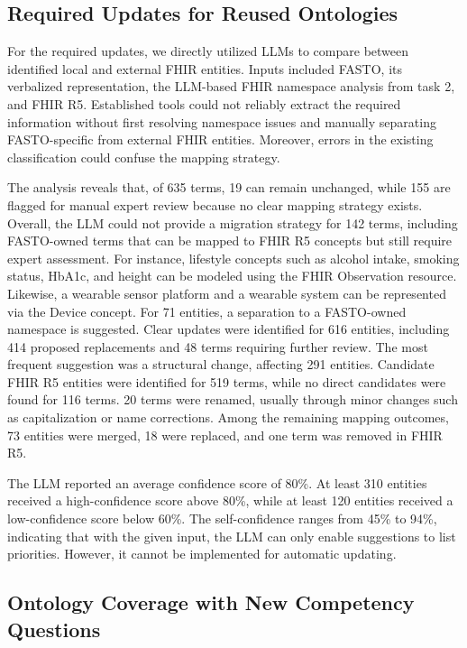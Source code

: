 \documentclass[
]{ceurart}
\begin{document}
\subsection{Required Updates for Reused Ontologies}

For the required updates, we directly utilized LLMs to compare between identified local and external FHIR entities. Inputs included FASTO, its verbalized representation, the LLM-based FHIR namespace analysis from task 2, and FHIR R5. Established tools could not reliably extract the required information without first resolving namespace issues and manually separating FASTO-specific from external FHIR entities. Moreover, errors in the existing classification could confuse the mapping strategy.

The analysis reveals that, of 635 terms, 19 can remain unchanged, while 155 are flagged for manual expert review because no clear mapping strategy exists. Overall, the LLM could not provide a migration strategy for 142 terms, including FASTO-owned terms that can be mapped to FHIR R5 concepts but still require expert assessment. For instance, lifestyle concepts such as alcohol intake, smoking status, HbA1c, and height can be modeled using the FHIR Observation resource. Likewise, a wearable sensor platform and a wearable system can be represented via the Device concept. For 71 entities, a separation to a FASTO-owned namespace is suggested. Clear updates were identified for 616 entities, including 414 proposed replacements and 48 terms requiring further review. The most frequent suggestion was a structural change, affecting 291 entities. Candidate FHIR R5 entities were identified for 519 terms, while no direct candidates were found for 116 terms. 20 terms were renamed, usually through minor changes such as capitalization or name corrections. Among the remaining mapping outcomes, 73 entities were merged, 18 were replaced, and one term was removed in FHIR R5. 

The LLM reported an average confidence score of 80\%. At least 310 entities received a high-confidence score above 80\%, while at least 120 entities received a low-confidence score below 60\%. The self-confidence ranges from 45\% to 94\%, indicating that with the given input, the LLM can only enable suggestions to list priorities. However, it cannot be implemented for automatic updating.



\subsection{Ontology Coverage with New Competency Questions}
\end{document}
